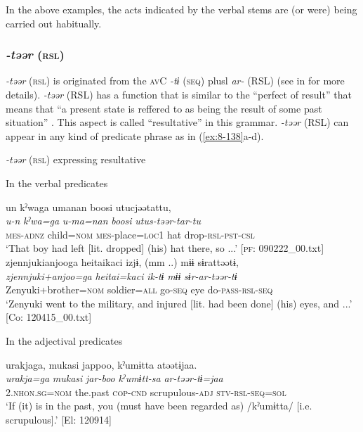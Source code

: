 In the above examples, the acts indicated by the verbal stems are (or were) being carried out habitually.

\subsubsection{\textit{-təər} (\textsc{rsl})}

\textit{-təər} (\textsc{rsl}) is originated from the \textsc{av}C \textit{-tɨ} (\textsc{seq}) plusl \textit{ar-} (RSL) (see  in  for more details). \textit{-təər} (RSL) has a function that is similar to the “perfect of result” that means that “a present state is reffered to as being the result of some past situation” \citep[56]{Comrie1976}. This aspect is called “resultative” in this grammar. \textit{-təər} (RSL) can appear in any kind of predicate phrase as in (\ref{ex:8-138}a-d).

\ea\label{ex:8-138}
  \textit{-təər} (\textsc{rsl}) expressing resultative

  In the verbal predicates

\ea [= (\ref{ex:6-132}a)]

{\TM}
\glll  un  kˀwaga  umanan  {\textbar}boosi{\textbar}  utucjəətattu,\\
\textit{u-n}  \textit{kˀwa=ga}  \textit{u-ma=nan}  \textit{boosi}  \textit{utus-təər-tar-tu}\\
\textsc{mes}-\textsc{adnz}  child=\textsc{nom}  \textsc{mes}-place=\textsc{loc}1  hat  drop-\textsc{rsl}-\textsc{pst}-\textsc{csl}\\
\glt ‘That boy had left [lit. dropped] (his) hat there, so ...’ [\textsc{pf}: 090222\_00.txt]
\ex
{\TM}
\glll  zjennjukianjooga  {\textbar}heitai{\textbar}kaci  izjɨ,  (mm ..)  mɨɨ      sɨrattəətɨ,        \\
\textit{zjennjuki+anjoo=ga}  \textit{heitai=kaci}  \textit{ik-tɨ}    \textit{mɨɨ}      \textit{sɨr-ar-təər-tɨ}\\
Zenyuki+brother=\textsc{nom}  soldier=\textsc{all}  go-\textsc{seq}    eye     do-\textsc{pass}-\textsc{rsl}-\textsc{seq}\\
\glt ‘Zenyuki went to the military, and injured [lit. had been done] (his) eyes, and ...’ [Co: 120415\_00.txt]

  In the adjectival predicates



{\TM}
\glll  urakjaga,  mukasi  jappoo,  kˀumɨtta      atəətɨjaa.\\
\textit{urakja=ga}  \textit{mukasi}  \textit{jar-boo}  \textit{kˀumɨtt-sa}      \textit{ar-təər-tɨ=jaa}\\
2.\textsc{nhon}.\textsc{sg}=\textsc{nom}  the.past  \textsc{cop}-\textsc{cnd}  scrupulous-\textsc{adj}   \textsc{stv}-\textsc{rsl}-\textsc{seq}=\textsc{sol}\\
\glt ‘If (it) is in the past, you (must have been regarded as) /kˀumɨtta/ [i.e. scrupulous].’ [El: 120914]

